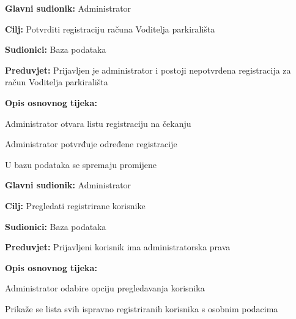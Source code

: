 \noindent {}
\begin{packed_item}

\item \textbf{Glavni sudionik: }Administrator
\item  \textbf{Cilj:} Potvrditi registraciju računa Voditelja parkirališta
\item  \textbf{Sudionici:} Baza podataka
\item  \textbf{Preduvjet:} Prijavljen je administrator i postoji nepotvrđena registracija za račun Voditelja parkirališta
\item  \textbf{Opis osnovnog tijeka:}

\item[] \begin{packed_enum}
	
	\item Administrator otvara listu registraciju na čekanju
	\item Administrator potvrđuje određene registracije
	\item U bazu podataka se spremaju promijene
	
\end{packed_enum}


\end{packed_item}

\noindent {}
\begin{packed_item}

\item \textbf{Glavni sudionik: }Administrator
\item  \textbf{Cilj:} Pregledati registrirane korisnike
\item  \textbf{Sudionici:} Baza podataka
\item  \textbf{Preduvjet:} Prijavljeni korisnik ima administratorska prava
\item  \textbf{Opis osnovnog tijeka:}

\item[] \begin{packed_enum}
	
	\item Administrator odabire opciju pregledavanja korisnika
	\item Prikaže se lista svih ispravno registriranih korisnika s osobnim podacima
	
\end{packed_enum}


\end{packed_item}

